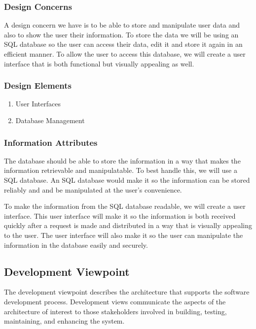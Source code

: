 \documentclass[letterpaper,10pt,titlepage,journal,compsoc,draftclsnofoot,onecolumn]{IEEEtran}
\begin{document}
\subsubsection{Design Concerns}

A design concern we have is to be able to store and manipulate user data and also to show the user their information. To store the data we will be using an SQL database so the user can access their data, edit it and store it again in an efficient manner. To allow the user to access this database, we will create a user interface that is both functional but visually appealing as well.

\subsubsection{Design Elements}

\begin{enumerate}

\item{User Interfaces}
\item{Database Management}
\end{enumerate}

\subsubsection{Information Attributes}

The database should be able to store the information in a way that makes the information retrievable and manipulatable. To best handle this, we will use a SQL database. An SQL database would make it so the information can be stored reliably and and be manipulated at the user's convenience. 

To make the information from the SQL database readable, we will create a user interface. This user interface will make it so the information is both received quickly after a request is made and distributed in a way that is visually appealing to the user. The user interface will also make it so the user can manipulate the information in the database easily and securely. 

\subsection{Development Viewpoint}

The development viewpoint describes the architecture that supports the software development process. Development views communicate the aspects of the architecture of interest to those stakeholders involved in building, testing, maintaining, and enhancing the system.
\end{document}
